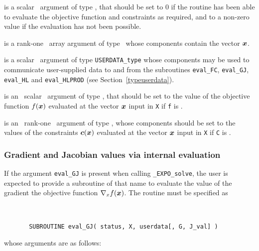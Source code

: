 \documentclass{galahad}
\newcommand{\packagename}{EXPO}
\newcommand{\fullpackagename}{\libraryname\_\packagename}
\newcommand{\solver}{{\tt \fullpackagename\_solve}}
\begin{document}
\begin{description}
 is a scalar \intentout\ argument of type \integer,
that should be set to 0 if the routine has been able to evaluate
the objective function and constraints as required,
and to a non-zero value if the evaluation has not been possible.

 is a rank-one \intentin\ array argument of type \realdp\
whose components contain the vector ${\bm{x}}$.

 is a scalar \intentinout\ argument of type
{\tt USERDATA\_type} whose components may be used
to communicate user-supplied data to and from the
subroutines {\tt eval\_FC}, {\tt eval\_GJ},
{\tt eval\_HL} and {\tt eval\_HLPROD}
(see Section~\ref{typeuserdata}).

 is an \optional\ scalar \intentout\ argument of type \realdp,
that should be set to the value of the objective function $f({\bm{x}})$
evaluated at the vector ${\bm{x}}$ input in {\tt X} if {\tt f} is \present.

 is an \optional\ rank-one \intentout\ argument of type \realdp,
whose components should be set to the values of the constraints
${\bm{c}}({\bm{x}})$ evaluated at the vector ${\bm{x}}$ input in {\tt X} 
if {\tt C} is \present.

\end{description}


\subsubsection{Gradient and Jacobian values via internal evaluation\label{gjfv}}

If the argument {\tt eval\_GJ} is present when calling \solver, the
user is expected to provide a subroutine of that name to evaluate the
value of the gradient the objective function $\nabla_x f({\bm{x}})$.
The routine must be specified as

\def\baselinestretch{0.8}
{\tt
\begin{verbatim}
       SUBROUTINE eval_GJ( status, X, userdata[, G, J_val] )
\end{verbatim} }
\def\baselinestretch{1.0}
\noindent whose arguments are as follows:
\end{document}

